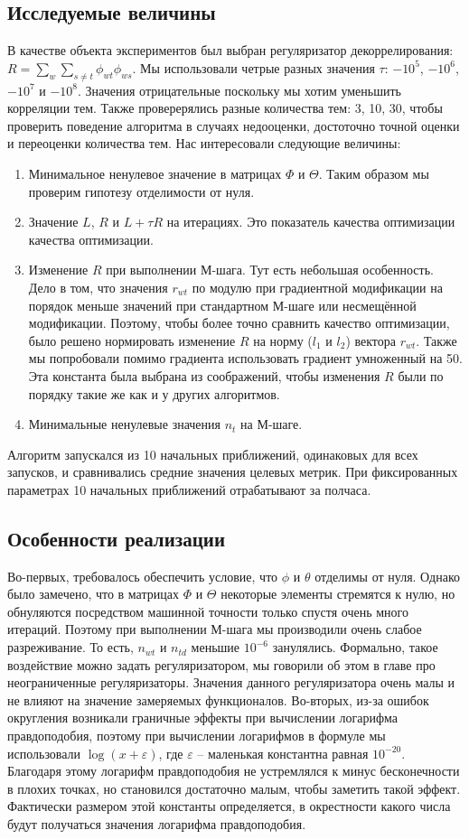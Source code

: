 \documentclass[12pt]{article}
\begin{document}
\subsection{Исследуемые величины}
В качестве объекта экспериментов был выбран регуляризатор декоррелирования: $R = \sum_w \sum_{s \neq t} \phi_{wt} \phi_{ws}$. Мы использовали четрые разных значения $\tau$: $-10^5$, $-10^6$, $-10^7$ и $-10^8$. Значения отрицательные поскольку мы хотим уменьшить корреляции тем. Также проверерялись разные количества тем: 3, 10, 30, чтобы проверить поведение алгоритма в случаях недооценки, достоточно точной оценки и переоценки  количества тем.  Нас интересовали следующие величины:
\begin{enumerate}
\item Минимальное ненулевое значение в матрицах $\Phi$ и $\Theta$. Таким образом мы проверим гипотезу  отделимости от нуля.
\item Значение $L$, $R$ и $L + \tau R$ на итерациях. Это показатель качества оптимизации качества оптимизации.
\item Изменение $R$ при выполнении М-шага. Тут есть  небольшая особенность. Дело в том, что значения $r_{wt}$ по модулю  при градиентной модификации на порядок меньше значений при стандартном М-шаге или несмещённой модификации. Поэтому, чтобы более точно сравнить качество оптимизации,  было решено нормировать изменение $R$ на норму ($l_1$ и $l_2$) вектора $r_{wt}$. Также мы попробовали помимо градиента использовать градиент умноженный на 50. Эта константа была выбрана из соображений, чтобы изменения $R$ были по порядку такие же как и у других алгоритмов.
\item Минимальные ненулевые значения $n_t$  на М-шаге.
\end{enumerate}
Алгоритм  запускался из 10 начальных приближений, одинаковых для всех запусков, и сравнивались средние значения целевых метрик. При фиксированных параметрах 10 начальных приближений отрабатывают за полчаса.

\subsection{Особенности реализации}
Во-первых, требовалось обеспечить условие, что $\phi$ и $\theta$ отделимы от нуля. Однако было замечено, что в матрицах $\Phi$ и $\Theta$ некоторые элементы стремятся к нулю, но обнуляются посредством машинной точности только спустя очень много итераций. Поэтому при выполнении М-шага мы производили очень слабое разреживание. То есть, $n_{wt}$ и $n_{td}$ меньшие $10^{-6}$ занулялись. Формально, такое воздействие можно задать регуляризатором, мы говорили об этом в главе про неограниченные регуляризаторы. Значения данного регуляризатора очень малы и не влияют на значение замеряемых функционалов.
Во-вторых, из-за ошибок округления возникали граничные эффекты при вычислении логарифма правдоподобия, поэтому при вычислении логарифмов в формуле мы использовали $\log(x + \varepsilon)$, где $\varepsilon$ --  маленькая константна равная $10^{-20}$. Благодаря этому логарифм правдоподобия не устремлялся к минус бесконечности в плохих точках, но становился достаточно малым, чтобы заметить такой эффект. Фактически размером этой константы определяется, в окрестности какого числа будут получаться  значения логарифма правдоподобия.
\end{document}
